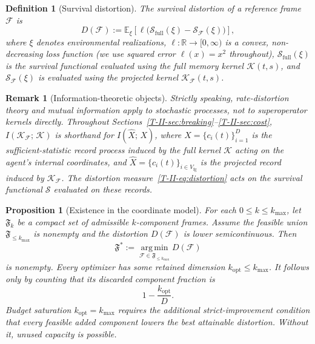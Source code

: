\documentclass[12pt,a4paper,openany]{book}
\newtheorem{proposition}[theorem]{Proposition}
\newtheorem{definition}[theorem]{Definition}
\newtheorem{remark}[theorem]{Remark}
\begin{document}
\begin{definition}[Survival distortion]
\label{T-II-def:survival_distortion}
The \emph{survival distortion} of a reference frame
$\mathcal{F}$ is
\begin{equation}
\label{T-II-eq:distortion}
D(\mathcal{F})
:= \mathbb{E}_{\xi}\!\left[
  \ell\!\bigl(\mathcal{S}_{\mathrm{full}}(\xi)
  - \mathcal{S}_{\mathcal{F}}(\xi)\bigr)
\right],
\end{equation}
where $\xi$ denotes environmental realizations,
$\ell: \mathbb{R} \to [0,\infty)$ is a convex,
non-decreasing loss function (we use squared error
$\ell(x) = x^2$ throughout),
$\mathcal{S}_{\mathrm{full}}(\xi)$ is the survival
functional evaluated using the full memory kernel
$\mathcal{K}(t,s)$, and $\mathcal{S}_{\mathcal{F}}(\xi)$
is evaluated using the projected kernel
$\mathcal{K}_{\mathcal{F}}(t,s)$.
\end{definition}

\begin{remark}[Information-theoretic objects]
\label{T-II-rem:info_objects}
Strictly speaking, rate-distortion theory and mutual
information apply to stochastic processes, not to
superoperator kernels directly.
Throughout
Sections~\ref{T-II-sec:breaking}--\ref{T-II-sec:cost},
$I(\mathcal{K}_{\mathcal{F}};\,\mathcal{K})$ is shorthand
for $I(\hat{X};\,X)$, where
$X = \{c_i(t)\}_{i=1}^{D}$ is the sufficient-statistic
record process induced by the full kernel $\mathcal{K}$
acting on the agent's internal coordinates, and
$\hat{X} = \{c_i(t)\}_{i \in V_{\mathrm{fg}}}$ is the
projected record induced by
$\mathcal{K}_{\mathcal{F}}$.
The distortion measure~\eqref{T-II-eq:distortion} acts on the
survival functional $\mathcal{S}$ evaluated on these
records.
\end{remark}

\begin{proposition}[Existence in the coordinate model]
\label{T-II-prop:compression_existence}
For each $0\leq k\leq k_{\max}$, let $\mathfrak F_k$ be a
compact set of admissible $k$-component frames.  Assume the feasible
union $\mathfrak F_{\leq k_{\max}}$ is nonempty and the distortion
$D(\mathcal F)$ is lower semicontinuous.  Then
\begin{equation}
\label{T-II-eq:k_star}
\mathfrak F^*:=\operatorname*{arg\,min}_{
\mathcal F\in\mathfrak F_{\leq k_{\max}}}D(\mathcal F)
\end{equation}
is nonempty.  Every optimizer has some retained dimension
$k_{\mathrm{opt}}\leq k_{\max}$.  It follows only by counting that its
discarded component fraction is
\begin{equation}
\label{T-II-eq:discard_fraction}
1-\frac{k_{\mathrm{opt}}}{D}.
\end{equation}
Budget saturation $k_{\mathrm{opt}}=k_{\max}$ requires the additional
strict-improvement condition that every feasible added component lowers
the best attainable distortion.  Without it, unused capacity is
possible.
\end{proposition}
\end{document}
